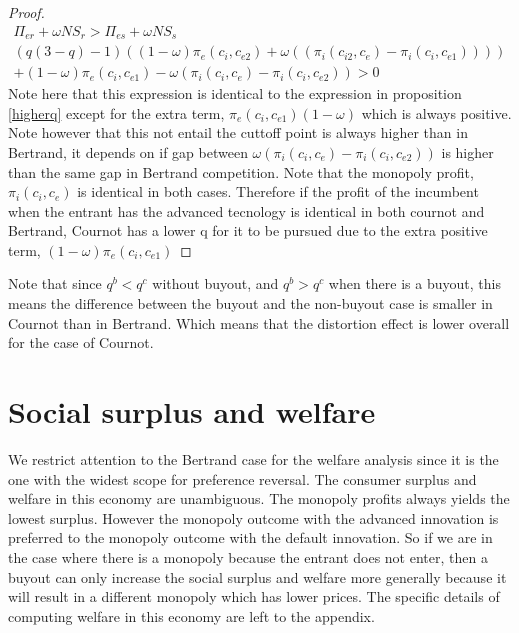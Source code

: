 \documentclass[11pt]{article}
\begin{document}
\begin{proof}
\begin{align*}
\Pi_{er} + \omega NS_{r}
> \Pi_{es} + \omega NS_{s} \\
(q  (3-q)-1)((1-\omega)\pi_{e}(c_i,c_{e2})+\omega((\pi_{i}(c_{i2},c_{e})-\pi_{i}(c_i,c_{e1})))) \\
+(1-\omega)\pi_{e}(c_i,c_{e1})
-\omega(\pi_{i}(c_i,c_{e}) 
-\pi_{i}(c_{i},c_{e2}))>0
\end{align*} 
Note here that this expression is identical to the expression in proposition \ref{higherq} except for the extra term, $\pi_{e}(c_i,c_{e1})(1-\omega)$ which is always positive. Note however that this not entail the cuttoff point is always higher than in Bertrand, it depends on if gap between $\omega(\pi_{i}(c_i,c_{e}) 
-\pi_{i}(c_{i},c_{e2}))$ is higher than the same gap in Bertrand competition. Note that the monopoly profit,$\pi_{i}(c_i,c_{e})$ is identical in both cases. Therefore if the profit of the incumbent when the entrant has the advanced tecnology is identical in both cournot and Bertrand, Cournot has a lower q for it to be pursued due to the extra positive term, $(1-\omega) \pi_e(c_i,c_{e1})$ 
\end{proof}

Note that since $q^b<q^c$ without buyout, and $q^b>q^c$ when there is a buyout, this means the difference between the buyout and the non-buyout case is smaller in Cournot than in Bertrand. Which means that the distortion effect is lower overall for the case of Cournot. 

\section*{ Social surplus and welfare}

We restrict attention to the Bertrand case for the welfare analysis since it is the one with the widest scope for preference reversal. The consumer surplus and welfare in this economy are unambiguous. The monopoly profits always yields the lowest surplus. However the monopoly outcome with the advanced innovation is preferred to the monopoly outcome with the default innovation. So if we are in the case where there is a monopoly because the entrant does not enter, then a buyout can only increase the social surplus and welfare more generally because it will result in a different monopoly which has lower prices. The specific details of computing welfare in this economy are left to the appendix. 
\end{document}
